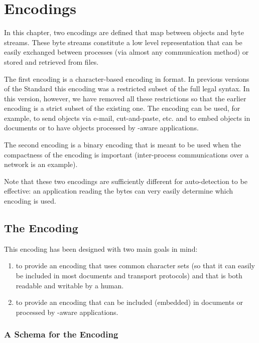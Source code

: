 \chapter{\OM Encodings}\label{cha_enco}

In this chapter, two encodings are defined that map between \OM objects and byte streams.
These byte streams constitute a low level representation that can be easily exchanged
between processes (via almost any communication method) or stored and retrieved from
files.

The first encoding is a character-based encoding in \XML format.  In previous versions of
the \OM Standard this encoding was a restricted subset of the full legal \XML syntax.  In
this version, however, we have removed all these restrictions so that the earlier encoding
is a strict subset of the existing one.  The \XML encoding can be used, for example, to
send \OM objects via e-mail, cut-and-paste, etc. and to embed \OM objects in \XML
documents or to have \OM objects processed by \XML-aware applications.

The second encoding is a binary encoding that is meant to be used when the compactness of
the encoding is important (inter-process communications over a network is an example).

Note that these two encodings are sufficiently different for
auto-detection to be effective: an application reading the bytes can
very easily determine which encoding is used.

\section{The \XML Encoding}\label{sec_xml}

This encoding has been designed with two main goals in mind:
\begin{enumerate}
\item to provide an encoding that uses common character sets (so that it can easily be
  included in most documents and transport protocols) and that is both readable and
  writable by a human.
\item to provide an encoding that can be included (embedded) in \XML documents or
  processed by \XML-aware applications.
\end{enumerate}

\subsection{A Schema for the \XML Encoding}\label{ssec_xml}

